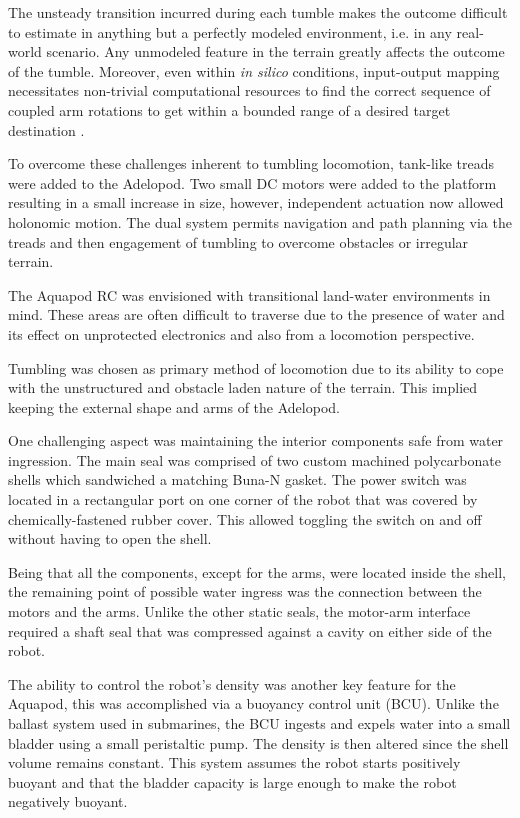 		The unsteady transition incurred during each tumble makes the outcome difficult to estimate in anything but a perfectly modeled environment, i.e. in any real-world scenario. Any unmodeled feature in the terrain greatly affects the outcome of the tumble. Moreover, even within \emph{in silico} conditions, input-output mapping necessitates non-trivial computational resources to find the correct sequence of coupled arm rotations to get within a bounded range of a desired target destination \cite{Hemes2008}. 

		To overcome these challenges inherent to tumbling locomotion, tank-like treads were added to the Adelopod. Two small DC motors were added to the platform resulting in a small increase in size, however, independent actuation now allowed holonomic motion. The dual system permits navigation and path planning via the treads and then engagement of tumbling to overcome obstacles or irregular terrain. 

		The Aquapod RC \cite{Carlson2011} was envisioned with transitional land-water environments in mind. These areas are often difficult to traverse due to the presence of water and its effect on unprotected electronics and also from a locomotion perspective. 

		Tumbling was chosen as primary method of locomotion due to its ability to cope with the unstructured and obstacle laden nature of the terrain. This implied keeping the external shape and arms of the Adelopod. 
		
		One challenging aspect was maintaining the interior components safe from water ingression. The main seal was comprised of two custom machined polycarbonate shells which sandwiched a matching Buna-N gasket. The power switch was located in a rectangular port on one corner of the robot that was covered by chemically-fastened rubber cover. This allowed toggling the switch on and off without having to open the shell. 

		Being that all the components, except for the arms, were located inside the shell, the remaining point of possible water ingress was the connection between the motors and the arms. Unlike the other static seals, the motor-arm interface required a shaft seal that was compressed against a cavity on either side of the robot.

		The ability to control the robot's density was another key feature for the Aquapod, this was accomplished via a buoyancy control unit (BCU). Unlike the ballast system used in submarines, the BCU ingests and expels water into a small bladder using a small peristaltic pump. The density is then altered since the shell volume remains constant. This system assumes the robot starts positively buoyant and that the bladder capacity is large enough to make the robot negatively buoyant. 

